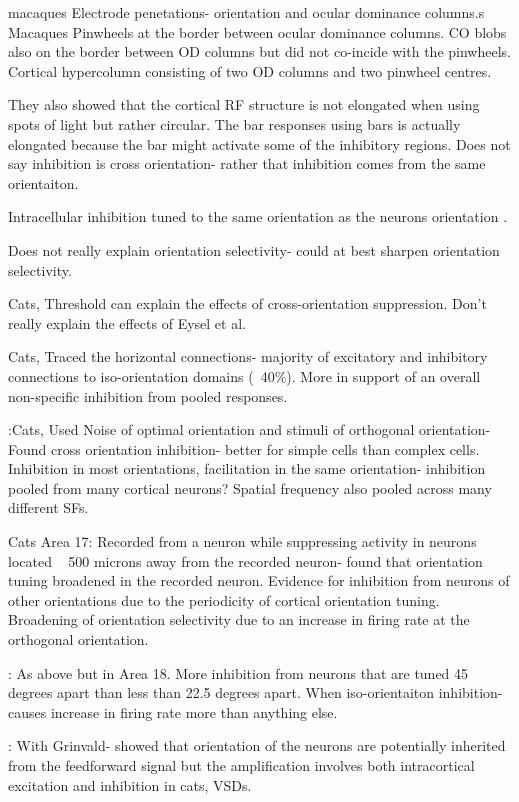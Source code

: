 \cite{Hubel1969} macaques Electrode penetations- orientation and ocular dominance columns.s
\cite{Bartfeld1992a} Macaques Pinwheels at the border between ocular dominance columns. CO blobs also on the border between OD columns but did not co-incide with the pinwheels. Cortical hypercolumn consisting of two OD columns and two pinwheel centres. 

They also showed that the cortical RF structure is not elongated when using spots of light but rather circular. The bar responses using bars is actually elongated because the bar might activate some of the inhibitory regions. Does not say inhibition is cross orientation- rather that inhibition comes from the same orientaiton. 

Intracellular inhibition tuned to the same orientation as the neurons orientation \cite{Anderson2000}.

Does not really explain orientation selectivity- could at best sharpen orientation selectivity.

\cite{Priebe2006} Cats, Threshold can explain the effects of cross-orientation suppression. Don't really explain the effects of Eysel et al.

\cite{Kisvarday1997} Cats, Traced the horizontal connections- majority of excitatory and inhibitory connections to iso-orientation domains (~40\%). More in support of an overall non-specific inhibition from pooled responses.

\cite{Morrone1982}:Cats, Used Noise of optimal orientation and stimuli of orthogonal orientation- Found cross orientation inhibition- better for simple cells than complex cells. Inhibition in most orientations, facilitation in the same orientation- inhibition pooled from many cortical neurons? Spatial frequency also pooled across many different SFs.

\cite{Worgotter1988, Eysel1990} Cats Area 17: Recorded from a neuron while suppressing activity in neurons located ~ 500 microns away from the recorded neuron- found that orientation tuning broadened in the recorded neuron. Evidence for inhibition from neurons of other orientations due to the periodicity of cortical orientation tuning. Broadening of orientation selectivity due to an increase in firing rate at the orthogonal orientation. 

\cite{Crook1992}: As above but in Area 18. More inhibition from neurons that are tuned 45 degrees apart than less than 22.5 degrees apart. When iso-orientaiton inhibition- causes increase in firing rate more than anything else.

\cite{Sharon2002}: With Grinvald- showed that orientation of the neurons are potentially inherited from the feedforward signal but the amplification involves both intracortical excitation and inhibition in cats, VSDs.

